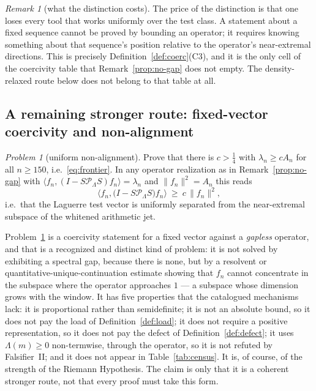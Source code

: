 \documentclass[11pt]{amsart}
\theoremstyle{definition}
\theoremstyle{remark}
\newtheorem{remark}[theorem]{Remark}
\newtheorem{problem}[theorem]{Problem}
\theoremstyle{definition}
\begin{document}
\begin{remark}[what the distinction costs]\label{rmk:distinction-cost}
The price of the distinction is that one loses every tool that works uniformly over the test class.
A statement about a fixed sequence cannot be proved by bounding an operator; it requires knowing
something about that sequence's position relative to the operator's near-extremal directions. This
is precisely Definition~\ref{def:coerc}(C3), and it is the only cell of the coercivity table that
Remark~\ref{prop:no-gap} does not empty. The density-relaxed route below does not belong to
that table at all.
\end{remark}

\subsection{A remaining stronger route: fixed-vector coercivity and non-alignment}\label{sec:nonalign}

\begin{problem}[uniform non-alignment]\label{prob:nonalign}
Prove that there is $c>\tfrac14$ with $\lambda_n\ge cA_n$ for all $n\ge150$, i.e.\
\eqref{eq:frontier}. In any operator realization as in Remark~\ref{prop:no-gap} with
$\langle f_n,(I-S\mathcal P_\Lambda S)f_n\rangle=\lambda_n$ and $\|f_n\|^2=A_n$ this reads
\begin{equation}\label{eq:nonalign}
   \bigl\langle f_n,\bigl(I-S\mathcal P_\Lambda S\bigr)f_n\bigr\rangle
   \ \ge\ c\,\|f_n\|^2 ,
\end{equation}
i.e.\ that the Laguerre test vector is uniformly separated from the near-extremal subspace of the
whitened arithmetic jet.
\end{problem}

Problem~\ref{prob:nonalign} is a coercivity statement for a fixed vector against a \emph{gapless}
operator, and that is a recognized and distinct kind of problem: it is not solved by exhibiting a
spectral gap, because there is none, but by a resolvent or quantitative-unique-continuation
estimate showing that $f_n$ cannot concentrate in the subspace where the operator approaches $1$ ---
a subspace whose dimension grows with the window. It has five properties that the catalogued
mechanisms lack: it is proportional rather than semidefinite; it is
not an absolute bound, so it does not pay the load of Definition~\ref{def:load}; it does not require
a positive representation, so it does not pay the defect of Definition~\ref{def:defect}; it uses
$\Lambda(m)\ge0$ non-termwise, through the operator, so it is not refuted by Falsifier~II; and it
does not appear in Table~\ref{tab:census}. It is, of course, of the strength of the Riemann
Hypothesis. The claim is only that it is a coherent stronger route, not that every proof must take
this form.
\end{document}
